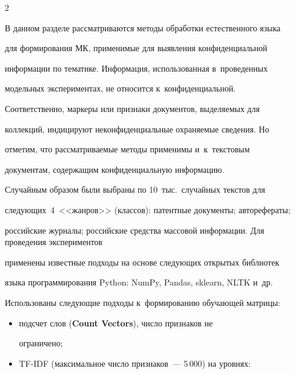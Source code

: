 \begin{multicols}{2}
  


  В данном разделе рассматриваются методы обработки естественного языка 


для формирования МК, применимые для выявления кон\-фи\-ден\-ци\-альной 


информации по тематике. Информация, использованная в~проведенных 


модельных экспериментах, не относится к~конфиденциальной. 


Соответственно, маркеры или признаки документов, выделяемых для 


коллекций, индицируют неконфиденциальные охраняемые сведения. Но 


отметим, что рассматриваемые методы применимы и~к~текстовым 


документам, содержащим конфиденциальную информацию.


  


  Случайным образом были выбраны по 10~тыс.\ случайных текстов для  


сле\-ду\-ющих~4~<<жанров>> (классов): патентные документы; авторефераты; 


российские журналы; российские средства массовой информации. Для проведения экспериментов 


применены известные подходы на основе сле\-ду\-ющих открытых библиотек 


языка программирования Python: NumPy, Pandas, sklearn, NLTK и~др. 


Использованы следующие подходы к~формированию обучающей матрицы:


  \begin{itemize}


\item подсчет слов (\textbf{Count Vectors}), число признаков не 


ограничено;


\item TF-IDF (максимальное число признаков~--- 5\,000) на уровнях: 


\end{itemize}
\end{multicols}
